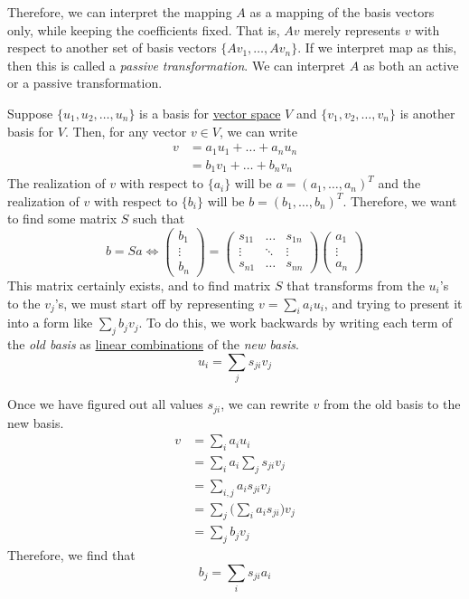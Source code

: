 	Therefore, we can interpret the mapping $A$ as a mapping of the basis vectors only, while keeping the coefficients fixed. That is, $Av$ merely represents $v$ with respect to another set of basis vectors $\{A v_1, \ldots, A v_n\}$. If we interpret map as this, then this is called a \textit{passive transformation}. We can interpret $A$ as both an active or a passive transformation. 

  Suppose $\{u_1, u_2, \ldots, u_n\}$ is a basis for \hyperref[def:vector-space]{vector space} $V$ and $\{v_1, v_2, \ldots, v_n\}$ is another basis for $V$. Then, for any vector $v \in V$, we can write 
	\begin{align}
		v & = a_1 u_1 + \ldots + a_n u_n \\ 
			& = b_1 v_1 + \ldots + b_n v_n
	\end{align}
	The realization of $v$ with respect to $\{a_i\}$ will be $a = (a_1, \ldots, a_n)^T$ and the realization of $v$ with respect to $\{b_i\}$ will be $b = (b_1, \ldots, b_n)^T$. Therefore, we want to find some matrix $S$ such that 
	\begin{equation}
		b = Sa \iff \begin{pmatrix} b_1 \\ \vdots \\ b_n \end{pmatrix} = \begin{pmatrix} s_{11} & \ldots & s_{1n} \\  \vdots & \ddots & \vdots \\ s_{n1} & \ldots & s_{nn} \end{pmatrix} \begin{pmatrix} a_1 \\ \vdots \\ a_n \end{pmatrix} 
	\end{equation}
	This matrix certainly exists, and to find matrix $S$ that transforms from the $u_i$'s to the $v_j$'s, we must start off by representing $v = \sum_i a_i u_i$, and trying to present it into a form like $\sum_j b_j v_j$. To do this, we work backwards by writing each term of the \textit{old basis} as \hyperref[def:linear-combination]{linear combinations} of the \textit{new basis}. 
	\begin{equation}
		u_i = \sum_{j} s_{ji} v_j
	\end{equation}

	Once we have figured out all values $s_{ji}$, we can rewrite $v$ from the old basis to the new basis. 
	\begin{align}
		v & = \sum_{i} a_i u_i \\ 
			& = \sum_{i} a_i \sum_j s_{ji} v_j \\ 
			& = \sum_{i, j} a_i s_{ji} v_j \\ 
			& = \sum_{j} \bigg( \sum_i a_i s_{ji} \bigg) v_j \\ 
			& = \sum_j b_j v_j
	\end{align} 
	Therefore, we find that 
	\begin{equation}
		b_j = \sum_i s_{ji} a_i 
	\end{equation} 

